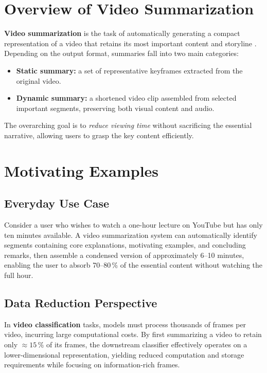 \documentclass[12pt, a4paper]{report}
\begin{document}
\section{Overview of Video Summarization}

\textbf{Video summarization} is the task of automatically generating a compact
representation of a video that retains its most important content and storyline
\cite{haq2021,money2015}. Depending on the output format, summaries fall into two
main categories:

\begin{itemize}[leftmargin=1.5cm]
  \item \textbf{Static summary:} a set of representative keyframes extracted from
        the original video.
  \item \textbf{Dynamic summary:} a shortened video clip assembled from selected
        important segments, preserving both visual content and audio.
\end{itemize}

The overarching goal is to \emph{reduce viewing time} without sacrificing the essential
narrative, allowing users to grasp the key content efficiently.

\section{Motivating Examples}

\subsection{Everyday Use Case}
Consider a user who wishes to watch a one-hour lecture on YouTube but has only ten
minutes available. A video summarization system can automatically identify segments
containing core explanations, motivating examples, and concluding remarks, then
assemble a condensed version of approximately 6--10 minutes, enabling the user to
absorb 70--80\,\% of the essential content without watching the full hour.

\subsection{Data Reduction Perspective}
In \textbf{video classification} tasks, models must process thousands of frames per
video, incurring large computational costs. By first summarizing a video to retain
only $\approx 15\,\%$ of its frames, the downstream classifier effectively operates on
a lower-dimensional representation, yielding reduced computation and storage requirements
while focusing on information-rich frames.
\end{document}
